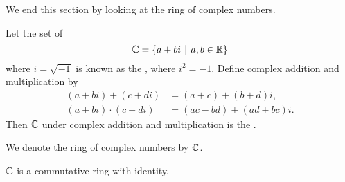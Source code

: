 We end this section by looking at the ring of complex numbers.
\begin{definition}
    Let the set of 
    \[
        \C = \{a + bi \vert a, b \in \R\}
    \]
    where $i = \sqrt{-1}$ is known as the , where $i^2 = -1$. Define complex addition and multiplication by
    \begin{align*}
        (a+bi) + (c+di) &= (a+c) + (b+d)i,\\
        (a+bi) \cdot (c+di) &= (ac-bd) + (ad+bc)i.
    \end{align*}
    Then $\mathbb{C}$ under complex addition and multiplication is the .
\end{definition}
\begin{remark}
    We denote the ring of complex numbers by $\mathbb{C}$.
\end{remark}
\begin{proposition}
    $\mathbb{C}$ is a commutative ring with identity.
\end{proposition}
